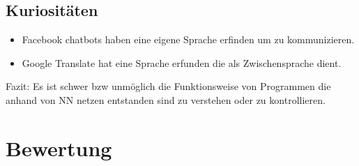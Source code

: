 \documentclass{article}
\begin{document}
\subsection{Kuriositäten}
\begin{itemize}
	\item Facebook chatbots haben eine eigene Sprache erfinden um zu kommunizieren.
	\item Google Translate hat eine Sprache erfunden die als Zwischensprache dient.
\end{itemize}
Fazit: Es ist schwer bzw unmöglich die Funktionsweise von Programmen die anhand von NN netzen entstanden sind zu verstehen oder zu kontrollieren.
\section{Bewertung}
	
\end{document}
